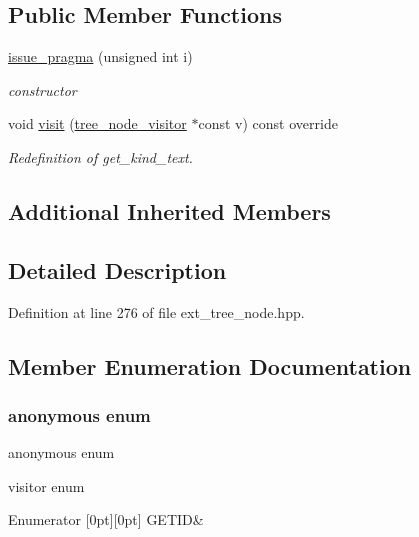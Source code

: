 \subsection*{Public Member Functions}
\begin{DoxyCompactItemize}
\item 
\hyperlink{structissue__pragma_a2fb0bb710fcd096ca1b9e24b396932a1}{issue\+\_\+pragma} (unsigned int i)
\begin{DoxyCompactList}\small\item\em constructor \end{DoxyCompactList}\item 
void \hyperlink{structissue__pragma_afc993f822027243a8112c2b3f07bb17a}{visit} (\hyperlink{classtree__node__visitor}{tree\+\_\+node\+\_\+visitor} $\ast$const v) const override
\begin{DoxyCompactList}\small\item\em Redefinition of get\+\_\+kind\+\_\+text. \end{DoxyCompactList}\end{DoxyCompactItemize}
\subsection*{Additional Inherited Members}


\subsection{Detailed Description}


Definition at line 276 of file ext\+\_\+tree\+\_\+node.\+hpp.



\subsection{Member Enumeration Documentation}
\mbox{\label{structissue__pragma_adf631266b05566f11057f85906bef09d}} 
\subsubsection{\texorpdfstring{anonymous enum}{anonymous enum}}
{\footnotesize\ttfamily anonymous enum}



visitor enum 

\begin{DoxyEnumFields}{Enumerator}
[0pt][0pt]{}\mbox{\label{structissue__pragma_adf631266b05566f11057f85906bef09daa1f1070d7403af9523d2a967027bee74}} 
G\+E\+T\+ID&\\
\hline

\end{DoxyEnumFields}


